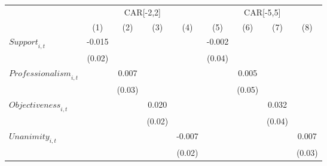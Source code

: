 {
\def\sym#1{\ifmmode^{#1}\else\(^{#1}\)\fi}
\begin{tabular}{l*{8}{c}}
\toprule
                    &\multicolumn{4}{c}{CAR[-2,2]}                                                          &\multicolumn{4}{c}{CAR[-5,5]}                                                          \\\cmidrule(lr){2-5}\cmidrule(lr){6-9}
                    &\multicolumn{1}{c}{(1)}         &\multicolumn{1}{c}{(2)}         &\multicolumn{1}{c}{(3)}         &\multicolumn{1}{c}{(4)}         &\multicolumn{1}{c}{(5)}         &\multicolumn{1}{c}{(6)}         &\multicolumn{1}{c}{(7)}         &\multicolumn{1}{c}{(8)}         \\
\midrule
$\textit{Support}_{i,t}$&      -0.015         &                     &                     &                     &      -0.002         &                     &                     &                     \\
                    &      (0.02)         &                     &                     &                     &      (0.04)         &                     &                     &                     \\
$\textit{Professionalism}_{i,t}$&                     &       0.007         &                     &                     &                     &       0.005         &                     &                     \\
                    &                     &      (0.03)         &                     &                     &                     &      (0.05)         &                     &                     \\
$\textit{Objectiveness}_{i,t}$&                     &                     &       0.020         &                     &                     &                     &       0.032         &                     \\
                    &                     &                     &      (0.02)         &                     &                     &                     &      (0.04)         &                     \\
$\textit{Unanimity}_{i,t}$&                     &                     &                     &      -0.007         &                     &                     &                     &       0.007         \\
                    &                     &                     &                     &      (0.02)         &                     &                     &                     &      (0.03)         \\

\end{tabular}}
